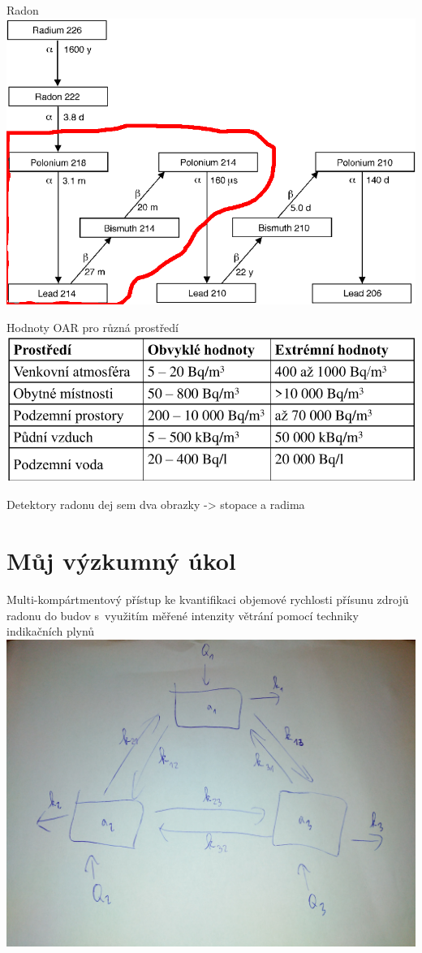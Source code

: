 \documentclass[10pt]{beamer}
\begin{document}
\begin{frame}{Radon}
    \small
    \centering
    \includegraphics[width=.8\textwidth]{radon_chain.png}
\end{frame}

\begin{frame}{Hodnoty OAR pro různá prostředí}
    \small
    \centering
    \includegraphics[width=.8\textwidth]{tabulka_hodnoty_radonu.png}
\end{frame}

\begin{frame}{Detektory radonu}
    \small
    dej sem dva obrazky -> stopace a radima
\end{frame}

\section{Můj výzkumný úkol}

\begin{frame}{Multi-kompártmentový přístup ke kvantifikaci  objemové rychlosti přísunu zdrojů radonu do budov s využitím měřené intenzity větrání pomocí techniky indikačních plynů}
    \small
    \centering
        \includegraphics[width=.8\textwidth]{model.jpg}
\end{frame}
\end{document}
